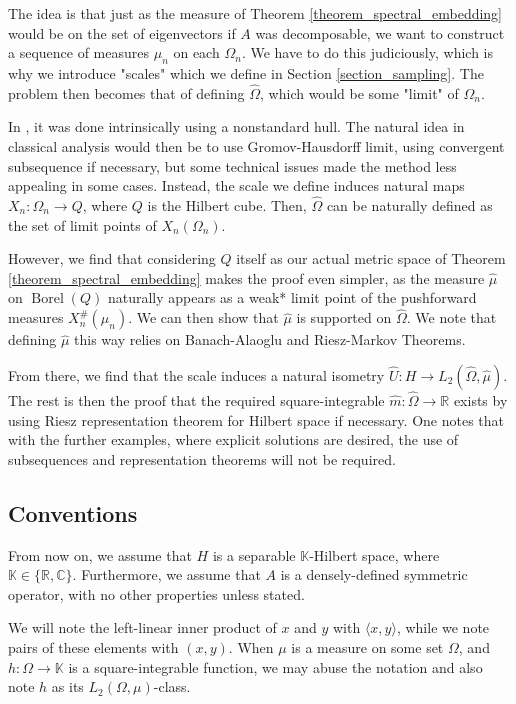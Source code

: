 \documentclass[10pt,a4paper]{amsart}
\def \Borel{\operatorname{Borel}}
\def \HOM{\hat{\Omega}}
\def \HMU{\hat{\mu}}
\def \HU{\hat{U}}
\def \Hm{\hat{m}}
\def \LL{\langle}
\def \RR{\rangle}
\begin{document}
The idea is that just as the measure of Theorem \ref{theorem_spectral_embedding} would be on the set of eigenvectors if $A$ was decomposable, we want to construct a sequence of measures $\mu_n$ on each $\Omega_n.$ We have to do this judiciously, which is why we introduce "scales" which we define in Section \ref{section_sampling}. The problem then becomes that of defining $\HOM$, which would be some "limit" of $\Omega_n$. 

In \cite{nonez2024spectralequivalencesnonstandardsamplings}, it was done intrinsically using a nonstandard hull. The natural idea in classical analysis would then be to use Gromov-Hausdorff limit, using convergent subsequence if necessary, but some technical issues made the method less appealing in some cases. Instead, the scale we define induces natural maps $X_n:\Omega_n\rightarrow Q$, where $Q$ is the Hilbert cube. Then, $\HOM$ can be naturally defined as the set of limit points of $X_n(\Omega_n).$ 

However, we find that considering $Q$ itself as our actual metric space of Theorem \ref{theorem_spectral_embedding} makes the proof even simpler, as the measure $\HMU$ on $\Borel(Q)$ naturally appears as a weak* limit point of the pushforward measures $X_n^{\#}(\mu_n)$. We can then show that $\HMU$ is supported on $\HOM$. We note that defining $\HMU$ this way relies on Banach-Alaoglu and Riesz-Markov Theorems.


From there, we find that the scale induces a natural isometry $\HU: H\rightarrow L_2(\HOM,\HMU).$ The rest is then the proof that the required square-integrable $\Hm:\HOM\rightarrow\mathbb{R}$ exists by using Riesz representation theorem for Hilbert space if necessary. One notes that with the further examples, where explicit solutions are desired, the use of subsequences and representation theorems will not be required.


\subsection{Conventions}

From now on, we assume that $H$ is a separable $\mathbb{K}$-Hilbert space, where $\mathbb{K}\in\{\mathbb{R}, \mathbb{C} \}.$ Furthermore, we assume that $A$ is a densely-defined symmetric operator, with no other properties unless stated.

We will note the left-linear inner product of $x$ and $y$ with $\LL x,y\RR$, while we note pairs of these elements with $(x,y). $ When $\mu$ is a measure on some set $\Omega$, and $h:\Omega\rightarrow\mathbb{K}$ is a square-integrable function, we may abuse the notation and also note $h$ as its $L_2(\Omega,\mu)$-class.
\end{document}
